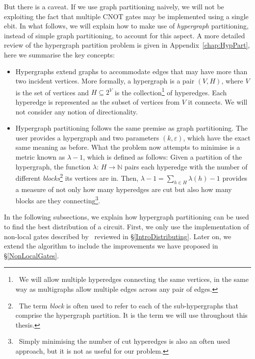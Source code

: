 But there is a caveat. If we use graph partitioning naively, we will not be exploiting the fact that multiple CNOT gates may be implemented using a single ebit. In what follows, we will explain how to make use of \textit{hypergraph} partitioning, instead of simple graph partitioning, to account for this aspect. A more detailed review of the hypergraph partition problem is given in Appendix~\ref{chap:HypPart}, here we summarise the key concepts:

\begin{itemize}
  \item Hypergraphs extend graphs to accommodate edges that may have more than two incident vertices. More formally, a hypergraph is a pair \((V,H)\), where \(V\) is the set of vertices and \(H \subseteq 2^V\) is the collection\footnote{\, We will allow multiple hyperedges connecting the same vertices, in the same way as multigraphs allow multiple edges across any pair of edges.} of hyperedges. Each hyperedge is represented as the subset of vertices from \(V\) it connects. We will not consider any notion of directionality.
  \item Hypergraph partitioning follows the same premise as graph partitioning. The user provides a hypergraph and two parameters \((k,\varepsilon)\), which have the exact same meaning as before. What the problem now attempts to minimise is a metric known as \(\lambda\!-\!1\), which is defined as follows: Given a partition of the hypergraph, the function \(\lambda\colon\, H \to \mathbb{N}\) pairs each hyperedge with the number of different \textit{blocks}\footnote{\, The term \textit{block} is often used to refer to each of the sub-hypergraphs that comprise the hypergraph partition. It is the term we will use throughout this thesis.} its vertices are in. Then, \(\lambda\!-\!1 = \sum_{h \in H} \lambda(h) - 1\) provides a measure of not only how many hyperedges are cut but also how many blocks are they connecting\footnote{\, Simply minimising the number of cut hyperedges is also an often used approach, but it is not as useful for our problem.}.
\end{itemize}

In the following subsections, we explain how hypergraph partitioning can be used to find the best distribution of a circuit. First, we only use the implementation of non-local gates described by~\citet{NonLocalCNOT} reviewed in \S\ref{IntroDistributing}. Later on, we extend the algorithm to include the improvements we have proposed in \S\ref{NonLocalGates}.

